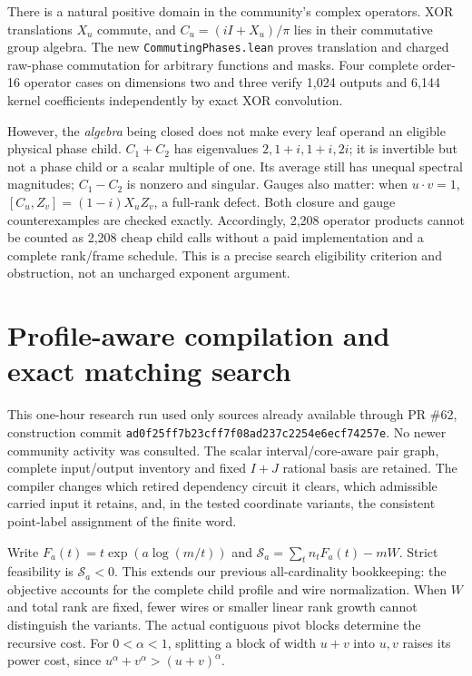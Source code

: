 \documentclass[11pt]{article}
\newcommand{\pii}{\pi}
\begin{document}
There is a natural positive domain in the community's complex operators.
XOR translations $X_u$ commute, and
$C_u=(iI+X_u)/\pii$ lies in their commutative group algebra. The new
\texttt{CommutingPhases.lean} proves translation and charged raw-phase
commutation for arbitrary functions and masks. Four complete order-16
operator cases on dimensions two and three verify 1,024 outputs and 6,144
kernel coefficients independently by exact XOR convolution.

However, the \emph{algebra} being closed does not make every leaf operand
an eligible physical phase child. $C_1+C_2$ has eigenvalues
$2,1+i,1+i,2i$; it is invertible but not a phase child or a scalar multiple
of one. Its average still has unequal spectral magnitudes; $C_1-C_2$ is
nonzero and singular. Gauges also matter:
when $u\cdot v=1$,
$[C_u,Z_v]=(1-i)X_uZ_v$, a full-rank defect. Both closure and gauge
counterexamples are checked exactly. Accordingly, 2,208 operator products
cannot be counted as 2,208 cheap child calls without a paid implementation
and a complete rank/frame schedule. This is a precise search eligibility
criterion and obstruction, not an uncharged exponent argument.

\section{Profile-aware compilation and exact matching search}
This one-hour research run used only sources already available through PR
\#62, construction commit
\texttt{ad0f25ff7b23cff7f08ad237c2254e6ecf74257e}. No newer community
activity was consulted. The scalar interval/core-aware pair graph, complete
input/output inventory and fixed $I+J$ rational basis are retained. The compiler
changes which retired dependency circuit it clears, which admissible carried
input it retains, and, in the tested coordinate variants, the consistent
point-label assignment of the finite word.

Write $F_a(t)=t\exp(a\log(m/t))$ and
$\mathcal S_a=\sum_t n_tF_a(t)-mW$. Strict feasibility is
$\mathcal S_a<0$. This extends our previous all-cardinality bookkeeping:
the objective accounts for the complete child profile and wire normalization.
When $W$ and total rank are fixed, fewer wires or smaller linear rank growth
cannot distinguish the variants. The actual contiguous pivot blocks determine
the recursive cost. For $0<\alpha<1$, splitting a block of width $u+v$ into
$u,v$ raises its power cost, since $u^\alpha+v^\alpha>(u+v)^\alpha$.
\end{document}

